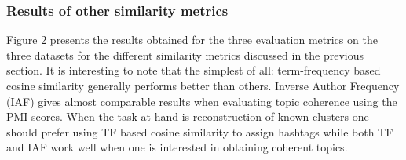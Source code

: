 \documentclass[10pt,a5paper,twoside]{article}
\begin{document}
\subsubsection{Results of other similarity metrics}
Figure 2 presents the results obtained for the three evaluation metrics on the three datasets for the different similarity metrics discussed in the previous section. It is interesting to note that the simplest of all: term-frequency based cosine similarity generally performs better than others. Inverse Author Frequency (IAF) gives almost comparable results when evaluating topic coherence using the PMI scores. When the task at hand is reconstruction of known clusters one should prefer using TF based cosine similarity to assign hashtags while both TF and IAF work well when one is interested in obtaining coherent topics.\\
\end{document}
